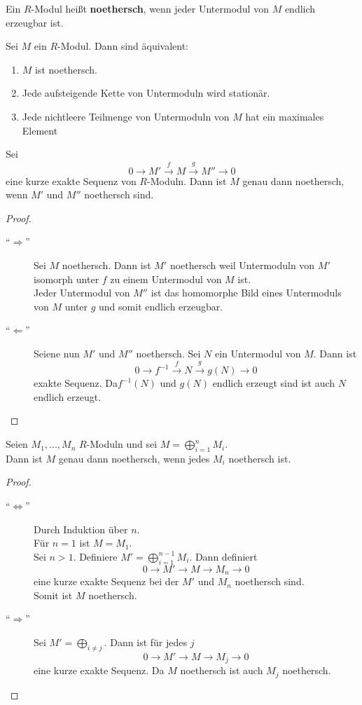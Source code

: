 	\begin{definition}
		Ein $R$-Modul heißt \textbf{noethersch}, wenn jeder Untermodul von $M$ endlich erzeugbar ist.
	\end{definition}

	\begin{satz}
		Sei $M$ ein $R$-Modul. Dann sind äquivalent:
		\begin{enumerate}
			\item $M$ ist noethersch.
			\item Jede aufsteigende Kette von Untermoduln wird stationär.
			\item Jede nichtleere Teilmenge von Untermoduln von $M$ hat ein maximales Element
		\end{enumerate}
	\end{satz}

	\begin{satz}
		Sei \[0\to M'\xrightarrow{f}M\xrightarrow{g}M''\to0\]
		eine kurze exakte Sequenz von $R$-Moduln. Dann ist $M$ genau dann noethersch, wenn $M'$ und $M''$ noethersch sind.
	\end{satz}
	\begin{proof}
		\begin{description}
			\item[\enquote{$\Rightarrow$}] Sei $M$ noethersch. Dann ist $M'$ noethersch weil Untermoduln von $M'$ isomorph unter $f$ zu einem Untermodul von $M$ ist.\\
			Jeder Untermodul von $M''$ ist das homomorphe Bild eines Untermoduls von $M$ unter $g$ und somit endlich erzeugbar.
			\item[\enquote{$\Leftarrow$}] Seiene nun $M'$ und $M''$ noethersch. Sei $N$ ein Untermodul von $M$. Dann ist
			\[0\to f^{-1}\xrightarrow{f}N\xrightarrow{g}g(N)\to0\]
			exakte Sequenz. Da$f^{-1}(N)$ und $g(N)$ endlich erzeugt sind ist auch $N$ endlich erzeugt.
		\end{description}
	\end{proof}

	\begin{satz}
		Seien $M_1,...,M_n$ $R$-Moduln und sei $M=\bigoplus_{i=1}^n M_i$.\\
		Dann ist $M$ genau dann noethersch, wenn jedes $M_i$ noethersch ist.
	\end{satz}
	\begin{proof}
		\begin{description}
			\item[\enquote{$\Leftrightarrow$}] Durch Induktion über $n$. \\
			Für $n=1$ ist $M=M_1$.\\
			Sei $n>1$. Definiere $M'=\bigoplus_{i=1}^{n-1}M_i$. Dann definiert
			\[0\to M'\xrightarrow{ }M\xrightarrow{ }M_n\to0\]
			eine kurze exakte Sequenz bei der $M'$ und $M_n$ noethersch sind.\\
			Somit ist $M$ noethersch.
			\item[\enquote{$\Rightarrow$}] Sei $M'=\bigoplus_{i\neq j}$. Dann ist für jedes $j$
			\[0\to M'\xrightarrow{ }M\xrightarrow{ }M_j\to0\]
			eine kurze exakte Sequenz. Da $M$ noethersch ist auch $M_j$ noethersch.
		\end{description}
	\end{proof}

